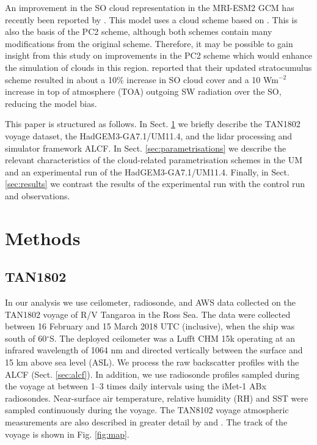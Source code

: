 An improvement in the SO cloud representation in the MRI-ESM2 GCM has recently been
reported by \cite{kawai2019}. This model uses a cloud scheme based on
\cite{tiedtke1993}. This is also the basis of the PC2 scheme, although both
schemes contain many modifications from the original scheme. Therefore, it may be
possible to gain insight from this study on improvements in the PC2 scheme which would enhance the simulation of clouds in this region. \cite{kawai2019} reported that their updated stratocumulus scheme resulted in about
a 10\% increase in SO cloud cover and a 10 Wm$^{-2}$ increase in top of atmosphere
(TOA) outgoing SW radiation over the SO, reducing the model bias.

This paper is structured as follows.
In Sect. \ref{sec:methods} we briefly describe the TAN1802 voyage dataset,
the HadGEM3-GA7.1/UM11.4, and the lidar processing and simulator framework ALCF.
In Sect. \ref{sec:parametrisations} we describe the
relevant characteristics of the cloud-related parametrisation schemes in the UM
and an experimental run of the HadGEM3-GA7.1/UM11.4. Finally, in Sect.
\ref{sec:results} we contrast the results
of the experimental run with the control run and observations.

\section{Methods}
\label{sec:methods}

\subsection{TAN1802}

In our analysis we use ceilometer, radiosonde, and AWS data collected on the TAN1802 voyage
of R/V Tangaroa in the Ross Sea. The data were collected
between 16 February and 15 March 2018 UTC (inclusive), when the ship was south of
60$^\circ$S. The deployed ceilometer was a Lufft CHM 15k operating at an
infrared wavelength of 1064 nm and directed vertically between the surface and 15 km above
sea level (ASL). We process the raw backscatter profiles with
the ALCF (Sect. \ref{sec:alcf}). In addition, we use radiosonde profiles
sampled during the voyage at between 1--3 times daily intervals
using the iMet-1 ABx radiosondes. Near-surface air temperature, relative humidity (RH) and SST were sampled continuously during the voyage. The TAN8102
voyage atmospheric measurements are also described in greater detail by
\cite{kuma2020a} and \cite{hartery2020a}. The track of the voyage
is shown in Fig. \ref{fig:map}.

